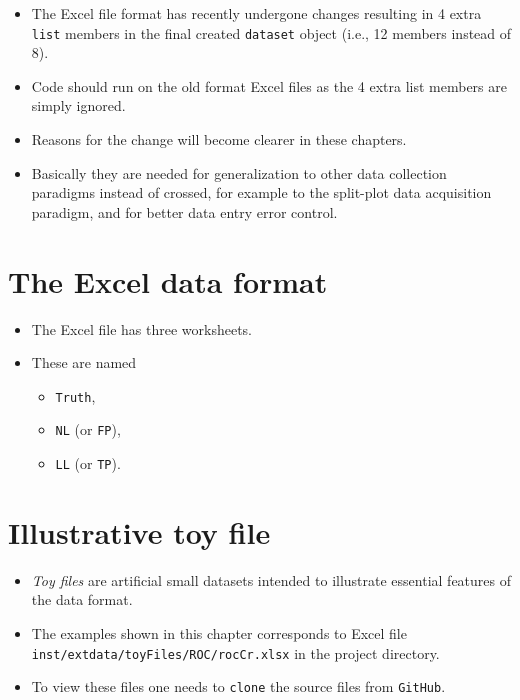 \documentclass[
]{book}
\providecommand{\tightlist}{%
  \setlength{\itemsep}{0pt}\setlength{\parskip}{0pt}}
\begin{document}
\begin{itemize}
\tightlist
\item
  The Excel file format has recently undergone changes resulting in 4 extra \texttt{list} members in the final created \texttt{dataset} object (i.e., 12 members instead of 8).
\item
  Code should run on the old format Excel files as the 4 extra list members are simply ignored.
\item
  Reasons for the change will become clearer in these chapters.
\item
  Basically they are needed for generalization to other data collection paradigms instead of crossed, for example to the split-plot data acquisition paradigm, and for better data entry error control.
\end{itemize}

\hypertarget{the-excel-data-format}{%
\section{The Excel data format}\label{the-excel-data-format}}

\begin{itemize}
\tightlist
\item
  The Excel file has three worksheets.
\item
  These are named

  \begin{itemize}
  \tightlist
  \item
    \texttt{Truth},
  \item
    \texttt{NL} (or \texttt{FP}),
  \item
    \texttt{LL} (or \texttt{TP}).
  \end{itemize}
\end{itemize}

\hypertarget{illustrative-toy-file}{%
\section{Illustrative toy file}\label{illustrative-toy-file}}

\begin{itemize}
\tightlist
\item
  \emph{Toy files} are artificial small datasets intended to illustrate essential features of the data format.\\
\item
  The examples shown in this chapter corresponds to Excel file \texttt{inst/extdata/toyFiles/ROC/rocCr.xlsx} in the project directory.
\item
  To view these files one needs to \texttt{clone} the source files from \texttt{GitHub}.
\end{itemize}
\end{document}
